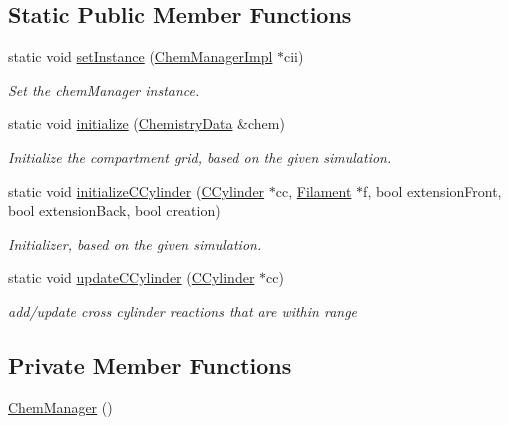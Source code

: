 \subsection*{Static Public Member Functions}
\begin{DoxyCompactItemize}
\item 
static void \hyperlink{classChemManager_a47f584be692f31e39d7598f4f7488796}{set\+Instance} (\hyperlink{classChemManagerImpl}{Chem\+Manager\+Impl} $\ast$cii)
\begin{DoxyCompactList}\small\item\em Set the chem\+Manager instance. \end{DoxyCompactList}\item 
static void \hyperlink{classChemManager_ab3344ccf25c9ea90337e90bd9cf5ebff}{initialize} (\hyperlink{structChemistryData}{Chemistry\+Data} \&chem)
\begin{DoxyCompactList}\small\item\em Initialize the compartment grid, based on the given simulation. \end{DoxyCompactList}\item 
static void \hyperlink{classChemManager_a8c3958ed962520cff0e1d26b92596e68}{initialize\+C\+Cylinder} (\hyperlink{classCCylinder}{C\+Cylinder} $\ast$cc, \hyperlink{classFilament}{Filament} $\ast$f, bool extension\+Front, bool extension\+Back, bool creation)
\begin{DoxyCompactList}\small\item\em Initializer, based on the given simulation. \end{DoxyCompactList}\item 
static void \hyperlink{classChemManager_ae85244eb50a4254d525eb749c44a96a6}{update\+C\+Cylinder} (\hyperlink{classCCylinder}{C\+Cylinder} $\ast$cc)
\begin{DoxyCompactList}\small\item\em add/update cross cylinder reactions that are within range \end{DoxyCompactList}\end{DoxyCompactItemize}
\subsection*{Private Member Functions}
\begin{DoxyCompactItemize}
\item 
\hyperlink{classChemManager_ac133ef2eabc4f5f002660f9d69e9c0fb}{Chem\+Manager} ()
\end{DoxyCompactItemize}
